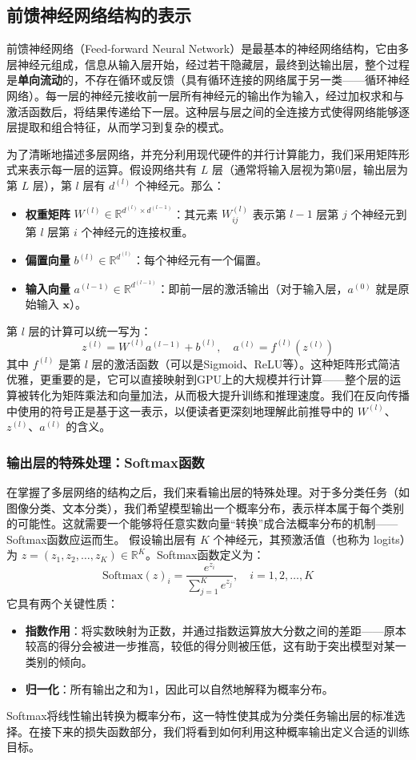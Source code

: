 \documentclass[lang=cn,zihao=-4,a4paper,fontset=windows]{beautybook}
\begin{document}
\subsection{前馈神经网络结构的表示}

前馈神经网络（Feed-forward Neural Network）是最基本的神经网络结构，它由多层神经元组成，信息从输入层开始，经过若干隐藏层，最终到达输出层，整个过程是\textbf{单向流动}的，不存在循环或反馈（具有循环连接的网络属于另一类——循环神经网络）。每一层的神经元接收前一层所有神经元的输出作为输入，经过加权求和与激活函数后，将结果传递给下一层。这种层与层之间的全连接方式使得网络能够逐层提取和组合特征，从而学习到复杂的模式。

为了清晰地描述多层网络，并充分利用现代硬件的并行计算能力，我们采用矩阵形式来表示每一层的运算。假设网络共有 $L$ 层（通常将输入层视为第0层，输出层为第 $L$ 层），第 $l$ 层有 $d^{(l)}$ 个神经元。那么：
\begin{itemize}
    \item \textbf{权重矩阵} $W^{(l)} \in \mathbb{R}^{d^{(l)} \times d^{(l-1)}}$：其元素 $W_{ij}^{(l)}$ 表示第 $l-1$ 层第 $j$ 个神经元到第 $l$ 层第 $i$ 个神经元的连接权重。
    \item \textbf{偏置向量} $b^{(l)} \in \mathbb{R}^{d^{(l)}}$：每个神经元有一个偏置。
    \item \textbf{输入向量} $a^{(l-1)} \in \mathbb{R}^{d^{(l-1)}}$：即前一层的激活输出（对于输入层，$a^{(0)}$ 就是原始输入 $\mathbf{x}$）。
\end{itemize}
第 $l$ 层的计算可以统一写为：
\[z^{(l)} = W^{(l)} a^{(l-1)} + b^{(l)}, \quad a^{(l)} = f^{(l)}(z^{(l)})\]
其中 $f^{(l)}$ 是第 $l$ 层的激活函数（可以是Sigmoid、ReLU等）。这种矩阵形式简洁优雅，更重要的是，它可以直接映射到GPU上的大规模并行计算——整个层的运算被转化为矩阵乘法和向量加法，从而极大提升训练和推理速度。我们在反向传播中使用的符号正是基于这一表示，以便读者更深刻地理解此前推导中的 $W^{(l)}$、$z^{(l)}$、$a^{(l)}$ 的含义。

\subsubsection{输出层的特殊处理：Softmax函数}
在掌握了多层网络的结构之后，我们来看输出层的特殊处理。对于多分类任务（如图像分类、文本分类），我们希望模型输出一个概率分布，表示样本属于每个类别的可能性。这就需要一个能够将任意实数向量“转换”成合法概率分布的机制——Softmax函数应运而生。
假设输出层有 $K$ 个神经元，其预激活值（也称为 logits）为 $z = (z_1, z_2, \dots, z_K) \in \mathbb{R}^K$。Softmax函数定义为：
\[\text{Softmax}(z)_i = \frac{e^{z_i}}{\sum_{j=1}^{K} e^{z_j}}, \quad i = 1, 2, \dots, K\]
它具有两个关键性质：
\begin{itemize}
    \item \textbf{指数作用}：将实数映射为正数，并通过指数运算放大分数之间的差距——原本较高的得分会被进一步推高，较低的得分则被压低，这有助于突出模型对某一类别的倾向。
    \item \textbf{归一化}：所有输出之和为1，因此可以自然地解释为概率分布。
\end{itemize}
Softmax将线性输出转换为概率分布，这一特性使其成为分类任务输出层的标准选择。在接下来的损失函数部分，我们将看到如何利用这种概率输出定义合适的训练目标。
\end{document}
